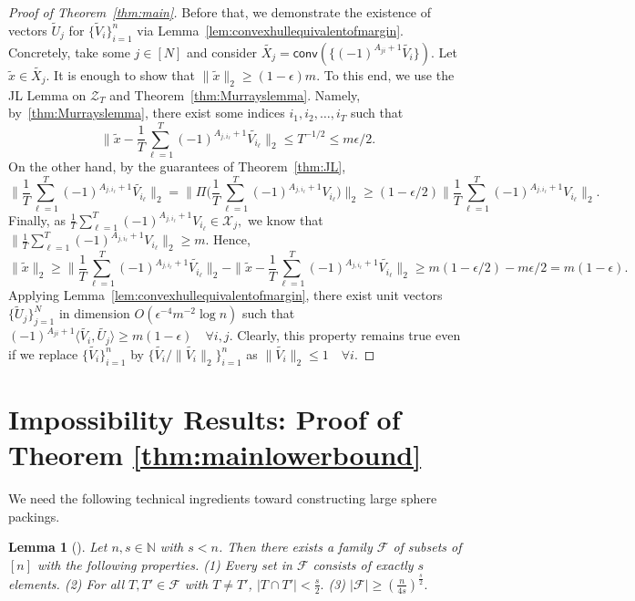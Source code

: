 \documentclass[preprint]{article}
\newtheorem{lemma}{Lemma}[]
\newcommand{\conv}{\mathsf{conv}}
\begin{document}
\begin{proof}[Proof of Theorem~\ref{thm:main}]
Before that, we demonstrate the existence of vectors $\widetilde{U}_j$ for $\{\widetilde{V}_i\}_{i = 1}^n$
via Lemma~\ref{lem:convexhullequivalentofmargin}. Concretely, take some $j \in [N]$ and consider $\widetilde{X_j} = \conv(\{(-1)^{A_{ji}+1}\widetilde{V_i}\}).$ Let $\widetilde{x}\in \widetilde{X_j}.$ It is enough to show that $\|\widetilde{x}\|_2\ge (1 - \epsilon)m.$ To this end, we use the JL Lemma on $\mathcal{Z}_T$ and Theorem~\ref{thm:Murrayslemma}.  Namely, by~\ref{thm:Murrayslemma}, there exist some indices $i_1, i_2, \ldots, i_T$ such that 
$$
\Big\|\widetilde{x} -\frac{1}{T}\sum_{\ell = 1}^T (-1)^{A_{j,i_\ell}+1}\widetilde{V_{i_\ell}}\Big\|_2\le 
T^{-1/2}\le 
m\epsilon/2.
$$
On the other hand, by the guarantees of Theorem~\ref{thm:JL}, 
$$
\Big\|\frac{1}{T}\sum_{\ell = 1}^T (-1)^{A_{j,i_\ell}+1}\widetilde{V_{i_\ell}}\Big\|_2 = 
\Big\|\Pi \Big(\frac{1}{T}\sum_{\ell = 1}^T (-1)^{A_{j,i_\ell}+1}V_{i_\ell}\Big)\Big\|_2\ge 
(1-\epsilon/2)
\Big\|\frac{1}{T}\sum_{\ell = 1}^T (-1)^{A_{j,i_\ell}+1}V_{i_\ell}\Big\|_2.
$$
Finally, as  $\frac{1}{T}\sum_{\ell = 1}^T (-1)^{A_{j,i_\ell}+1}V_{i_\ell}\in \mathcal{X}_j,$ we know that $\|\frac{1}{T}\sum_{\ell = 1}^T (-1)^{A_{j,i_\ell}+1}V_{i_\ell}\|_2\ge m.$
Hence,
$$
\|\widetilde{x}\|_2 \ge 
\|\frac{1}{T}\sum_{\ell = 1}^T (-1)^{A_{j,i_\ell}+1}\widetilde{V_{i_\ell}}\|_2 - 
\|\widetilde{x} -\frac{1}{T}\sum_{\ell = 1}^T (-1)^{A_{j,i_\ell}+1}\widetilde{V_{i_\ell}}\|_2\ge 
m(1-\epsilon/2) -
m\epsilon/2 = m(1-\epsilon). 
$$
Applying Lemma~\ref{lem:convexhullequivalentofmargin}, there exist unit vectors $\{\widetilde{U}_j\}_{j = 1}^N$ in dimension $O(\epsilon^{-4}m^{-2}\log n)$ such that 
$(-1)^{A_{ji}+1}\langle \widetilde{V_i}, \widetilde{U_j}\rangle\ge m(1-\epsilon)\quad \forall i,j.$ Clearly, this property remains true even if we replace $\{\widetilde{V_i}\}^n_{i = 1}$ by $\{\widetilde{V_i}/\|\widetilde{V_i}\|_2\}^n_{i = 1}$ as $\|\widetilde{V_i}\|_2\le 1 \quad \forall i.$\end{proof}

\section{Impossibility Results: Proof of Theorem \ref{thm:mainlowerbound}}
\label{sec:Lower Bounds}
We need the following technical ingredients toward constructing large sphere packings. 
\begin{lemma}[\cite{foucart2010gelfand}]
\label{lem:largedisjointfamilies}
    Let $n, s \in \mathbb{N}$ with $s < n$. Then there exists a family $\mathcal{F}$ of subsets of $[n]$ with the following properties. (1) Every set in $\mathcal{F}$ consists of exactly $s$ elements. (2) For all $T, T' \in \mathcal{F}$ with $T \neq T'$, $|T\cap T'| < \frac{s}{2}.$ (3) $|\mathcal{F}| \geq  (\frac{n}{4s}  )^\frac{s}{2}.$
\end{lemma}
\end{document}
